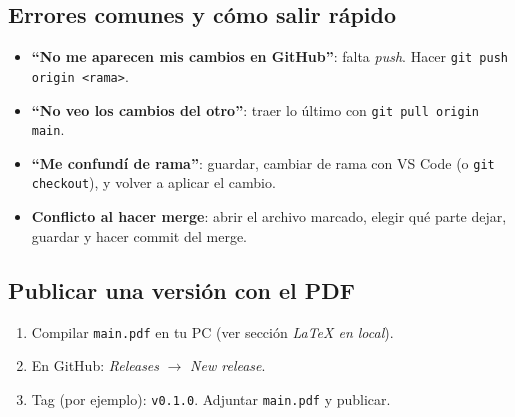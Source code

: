 \subsection*{Errores comunes y cómo salir rápido}
\begin{itemize}[leftmargin=1.2em]
  \item \textbf{“No me aparecen mis cambios en GitHub”}: falta \textit{push}. Hacer \texttt{git push origin <rama>}.
  \item \textbf{“No veo los cambios del otro”}: traer lo último con \texttt{git pull origin main}.
  \item \textbf{“Me confundí de rama”}: guardar, cambiar de rama con VS Code (o \texttt{git checkout}), y volver a aplicar el cambio.
  \item \textbf{Conflicto al hacer merge}: abrir el archivo marcado, elegir qué parte dejar, guardar y hacer commit del merge.
\end{itemize}

\subsection*{Publicar una versión con el PDF}
\begin{enumerate}[leftmargin=1.2em]
  \item Compilar \texttt{main.pdf} en tu PC (ver sección \textit{LaTeX en local}).
  \item En GitHub: \textit{Releases} $\rightarrow$ \textit{New release}. 
  \item Tag (por ejemplo): \texttt{v0.1.0}. Adjuntar \texttt{main.pdf} y publicar.
\end{enumerate}
